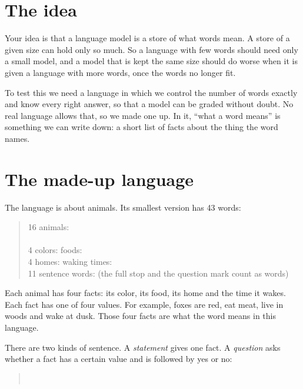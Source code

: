 \section{The idea}

Your idea is that a language model is a store of what words mean. A store of a given size can
hold only so much. So a language with few words should need only a small model, and a model
that is kept the same size should do worse when it is given a language with more words, once
the words no longer fit.

To test this we need a language in which we control the number of words exactly and know every
right answer, so that a model can be graded without doubt. No real language allows that, so we
made one up. In it, ``what a word means'' is something we can write down: a short list of facts
about the thing the word names.

\section{The made-up language}

The language is about animals. Its smallest version has 43 words:

\begin{quote}\small
16 animals: \\
\phantom{16 animals: }\\
4 colors:  foods: \\
4 homes:  waking times: \\
11 sentence words: \quad (the full stop and the question mark count as words)
\end{quote}

Each animal has four facts: its color, its food, its home and the time it wakes. Each fact has
one of four values. For example, foxes are red, eat meat, live in woods and wake at dusk. Those
four facts are what the word  means in this language.

There are two kinds of sentence. A \emph{statement} gives one fact. A \emph{question} asks
whether a fact has a certain value and is followed by yes or no:

\begin{quote}\small
{}\qquad {}\qquad {}\qquad
{}\\
\qquad {}
\end{quote}

